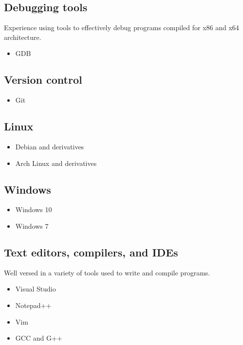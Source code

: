 \documentclass[letterpaper]{article}
\begin{document}
        \subsection*{Debugging tools}
        Experience using tools to effectively debug programs compiled for x86 and x64 architecture.

        \begin{itemize}
            \item GDB
        \end{itemize}

        \subsection*{Version control}

        \begin{itemize}
            \item Git
        \end{itemize}

        \subsection*{Linux}

        \begin{itemize}
            \item Debian and derivatives
            \item Arch Linux and derivatives
        \end{itemize}

        \subsection*{Windows}

        \begin{itemize}
            \item Windows 10
            \item Windows 7
        \end{itemize}

        \subsection*{Text editors, compilers, and IDEs}
        Well versed in a variety of tools used to write and compile programs.

        \begin{itemize}
            \item Visual Studio
            \item Notepad++
            \item Vim
            \item GCC and G++
        \end{itemize}
\end{document}
